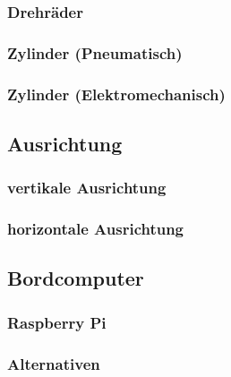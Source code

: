 \subsubsection{Drehräder}

\subsubsection{Zylinder (Pneumatisch)}

\subsubsection{Zylinder (Elektromechanisch)}

\subsection{Ausrichtung}

\subsubsection{vertikale Ausrichtung}

\subsubsection{horizontale Ausrichtung}

\subsection{Bordcomputer}

\subsubsection{Raspberry Pi}

\subsubsection{Alternativen}